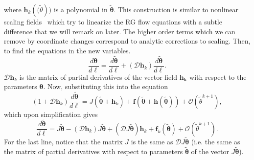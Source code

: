 \documentclass[
 reprint,
 amsmath,amssymb,
 aps, superscriptaddress, pre
]{revtex4-1}
\begin{document}
where $\bm{h}_k (\bm(\tilde \theta))$ is a polynomial in $\bm{\tilde \theta}$. This construction is similar  to nonlinear scaling fields~\cite{cardy1996scaling, Wegner72} which try to linearize the RG flow equations with a subtle difference that we will remark on later. The higher order terms which we can remove by coordinate changes correspond to analytic corrections to scaling. Then, to find the equations in the new variables.
\begin{equation}
 \frac{d \bm{\theta}}{d \ell} = \frac{d \bm{\tilde \theta}}{d \ell} + (\mathcal{D} \bm{h}_k) \frac{d \bm{\tilde \theta}}{d\ell} .
\end{equation}
$\mathcal{D} \bm{h}_k$ is the matrix of partial derivatives of the vector field $\bm{h_k}$ with respect to the parameters $\bm{\theta}$. Now, substituting this into the equation
\begin{equation}
 (1 + \mathcal{D} \bm{h}_k) \frac{d \bm{\tilde \theta}}{d \ell} = J (\bm{\tilde
    \theta} + \bm{h}_k) + \bm{f}(\bm{\tilde \theta} + \bm{h}(\bm{\tilde
    \theta})) + \mathcal{O}({\tilde \theta}^{k+1}), 
 \end{equation}
which upon simplification gives
 \begin{equation}
 \frac{d \bm{\tilde \theta}}{d \ell} = J \bm{\tilde \theta} - (\mathcal{D} \bm{h}_k) J \bm{\tilde \theta} + (\mathcal{D} J \bm{\tilde \theta}) \bm{h}_k + \bm{f}_k (\bm{\tilde \theta})+ \mathcal{O}({\tilde \theta}^{k+1}) .
\end{equation}
For the last line, notice that the matrix $J$ is the same as $\mathcal{D} J \bm{\tilde \theta}$ (i.e. the same as the matrix of partial derivatives with respect to parameters $\bm{\tilde \theta}$ of the vector $J \bm{\tilde \theta}$). 
\end{document}

